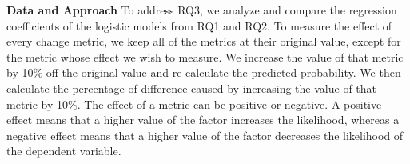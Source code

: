 


\noindent \textbf{Data and Approach}
To address RQ3, we analyze and compare the regression coefficients of the logistic models from RQ1 and RQ2. To measure the effect of every change metric, we keep all of the metrics at their original value, except for the metric whose effect we wish to measure. We increase the value of that metric by 10\% off the original value and re-calculate the predicted probability. We then calculate the percentage of difference caused by increasing the value of that metric by 10\%. The effect of a metric can be positive or negative. A positive effect means that a higher value of the factor increases the likelihood, whereas a negative effect means that a higher value of the factor decreases the likelihood of the dependent variable.






